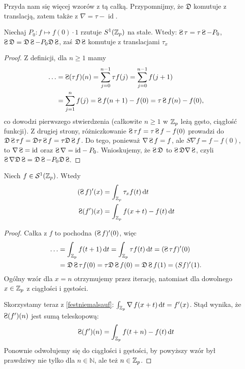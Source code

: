 Przyda nam się więcej wzorów z tą całką.
Przypomnijmy, że $\mathfrak D$ komutuje z translacją, zatem także z $\nabla = \tau - \operatorname{id}$.

\begin{fakt}
	Niechaj $P_0 \colon f \mapsto f(0) \cdot 1$ rzutuje $S^1(\mathbb Z_p)$ na stałe.
	Wtedy: $\suma  \tau = \tau \suma  - P_0$, $\suma \mathfrak D = \mathfrak D\suma  - P_0\mathfrak D\suma $, zaś $\mathfrak D\suma $ komutuje z translacjami $\tau_x$
\end{fakt}

\begin{proof}
	Z definicji, dla $n \ge 1$ mamy
	\begin{align*}
		\dots & = \suma (\tau f)(n) = \sum_{j=0}^{n-1} \tau f(j) = \sum_{j=0}^{n-1} f(j+1) \\
		& = \sum_{j = 1}^{n} f(j) = \suma f(n+1) - f(0) = \tau \suma f(n) - f(0),
	\end{align*}
	co dowodzi pierwszego stwierdzenia (całkowite $n \ge 1$ w $\mathbb Z_p$ leżą gęsto, ciągłość funkcji).
	Z drugiej strony, różniczkowanie $\suma \tau f=  \tau \suma f - f(0)$ prowadzi do $\mathfrak D\suma \tau f = \mathfrak D \tau \suma f = \tau \mathfrak D \suma f$.
	Do tego, ponieważ $\nabla \suma f = f$, ale $S \nabla f = f - f(0)$, to $\nabla \suma = \textrm{id}$ oraz $\suma \nabla = \textrm{id} - P_0$.
	Wnioskujemy, że $\suma \mathfrak D$ to $\suma \mathfrak D \nabla \suma$, czyli $\suma \nabla \mathfrak D \suma = \mathfrak D \suma - P_0 \mathfrak D\suma$.
\end{proof}

\begin{fakt} %
	Niech $f \in \mathcal S^1(\mathbb Z_p)$. Wtedy
	\begin{align*}
		(\suma f)'(x) & = \intzp \tau_x f(t)\,\textrm{d}t \\
		\suma(f')(x)  & = \intzp f(x+t) - f(t) \,\textrm{d}t
	\end{align*}
\end{fakt}

\begin{proof}
	Całka z $f$ to pochodna $(\suma f)'(0)$, więc
	\begin{align*}
		\ldots & = \intzp f(t+1) \,\textrm{d}t = \intzp \tau f(t) \,\textrm{d}t = (\suma \tau f)'(0) \\
		& = \mathfrak D \suma \tau f(0) = \tau \mathfrak D \suma f(0) = \mathfrak D \suma f(1) = (Sf)'(1).
	\end{align*}
	Ogólny wzór dla $x = n$ otrzymujemy przez iterację, natomiast dla dowolnego $x \in \mathbb Z_p$ z ciągłości i gęstości.

	Skorzystamy teraz z \ref{festniemalsauf}: $\int_{\mathbb Z_p} \operatorname{\nabla} f(x + t) \,\textrm{d}t = f'(x)$.
	Stąd wynika, że $\suma (f')(n)$ jest sumą teleskopową:
	\[
		\suma(f')(n) = \intzp f(t+n) - f(t) \,\textrm{d}t
	\]
	Ponownie odwołujemy się do ciągłości i gęstości, by powyższy wzór był prawdziwy nie tylko dla $n \in \mathbb N$, ale też $n \in \mathbb Z_p$.
\end{proof}

